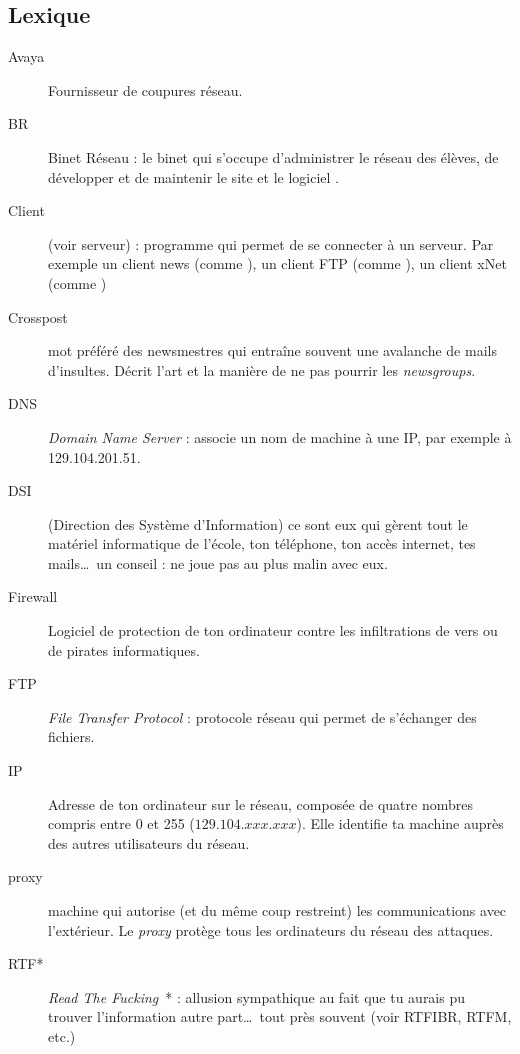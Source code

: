 
\subsection{Lexique}

\begin{description}
  \item[Avaya] Fournisseur de coupures réseau.
  \item[BR] Binet Réseau : le binet qui s'occupe d'administrer le réseau des élèves, de développer et de maintenir le site  et le logiciel .
  \item[Client] (voir serveur) : programme qui permet de se connecter à un serveur. Par exemple un client news (comme ), un client FTP (comme ), un client xNet (comme )
  \item[Crosspost] mot préféré des newsmestres qui entraîne souvent une avalanche de mails d'insultes. Décrit l'art et la manière de ne pas pourrir les \emph{newsgroups}.
  \item[DNS] \emph{Domain Name Server} : associe un nom de machine à une IP, par exemple  à 129.104.201.51.
  \item[DSI] (Direction des Système d'Information) ce sont eux qui gèrent tout le matériel informatique de l'école, ton téléphone, ton accès internet, tes mails\ldots\ un conseil : ne joue pas au plus malin avec eux.
  \item[Firewall] Logiciel de protection de ton ordinateur contre les infiltrations de vers ou de pirates informatiques.
  \item[FTP] \emph{File Transfer Protocol} : protocole réseau qui permet de s'échanger des fichiers.
  \item[IP] Adresse de ton ordinateur sur le réseau, composée de quatre nombres compris entre 0 et 255 ($129.104.xxx.xxx$). Elle identifie ta machine auprès des autres utilisateurs du réseau.
  \item[proxy] machine qui autorise (et du même coup restreint) les communications avec l'extérieur. Le \emph{proxy} protège tous les ordinateurs du réseau des attaques.
  \item[RTF*] \emph{Read The Fucking}\ * : allusion sympathique au fait que tu aurais pu trouver l'information autre part\ldots\ tout près souvent (voir RTFIBR, RTFM, etc.)

\end{description}
